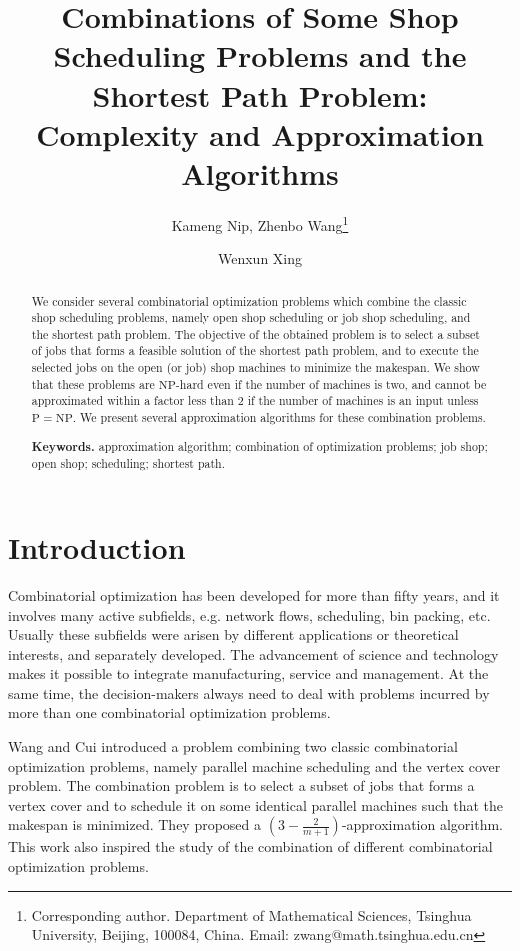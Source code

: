 \documentclass{llncs}
\numberwithin{subcase}{case}
\begin{document}
\title{Combinations of Some Shop Scheduling Problems and the Shortest Path Problem: Complexity and Approximation Algorithms}

\author{Kameng Nip, Zhenbo Wang\thanks{Corresponding author. Department of Mathematical Sciences, Tsinghua University, Beijing, 100084, China. Email: zwang@math.tsinghua.edu.cn} \and Wenxun Xing}

\maketitle
\begin{abstract}
We consider several combinatorial optimization problems which combine the classic shop scheduling problems, namely open shop scheduling or job shop scheduling, and the shortest path problem. The objective of the obtained problem is to select a subset of jobs that forms a feasible solution of the shortest path problem, and to execute the selected jobs on the open (or job) shop machines to minimize the makespan. We show that these problems are $\mathrm{NP}$-hard even if the number of machines is two, and cannot be approximated within a factor less than 2 if the number of machines is an input unless $\mathrm{P}=\mathrm{NP}$. We present several approximation algorithms for these combination problems.

\noindent \textbf{Keywords.} approximation algorithm; combination of optimization problems; job shop; open shop; scheduling; shortest path.
\end{abstract}

\section{Introduction}
Combinatorial optimization has been developed for more than fifty years, and it involves many active subfields, e.g. network flows, scheduling, bin packing, etc. Usually these subfields were arisen by different applications or theoretical interests, and separately developed. The advancement of science and technology makes it possible to integrate manufacturing, service and management. At the same time, the decision-makers always need to deal with problems incurred by more than one combinatorial optimization problems.

Wang and Cui \cite{WC12} introduced a problem combining two classic combinatorial optimization problems, namely parallel machine scheduling and the vertex cover problem. The combination problem is to select a subset of jobs that forms a vertex cover and to schedule it on some identical parallel machines such that the makespan is minimized. They proposed a $(3 - \frac{2}{m+1})$-approximation algorithm. This work also inspired the study of the combination of different combinatorial optimization problems.
\end{document}
